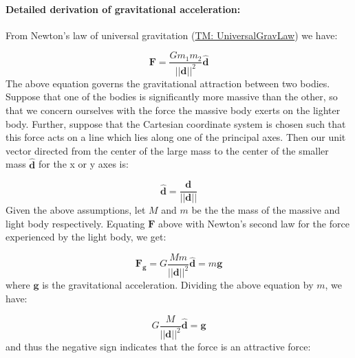 \documentclass[12pt]{article}
\begin{document}
\paragraph{Detailed derivation of gravitational acceleration:}
\label{GD:accelGravityDeriv}
From Newton's law of universal gravitation (\hyperref[TM:UniversalGravLaw]{TM: UniversalGravLaw}) we have:

\begin{displaymath}
\mathbf{F}=\frac{G {m_{1}} {m_{2}}}{{\text{||}\mathbf{d}\text{||}^{2}}} \mathbf{\hat{d}}
\end{displaymath}
The above equation governs the gravitational attraction between two bodies. Suppose that one of the bodies is significantly more massive than the other, so that we concern ourselves with the force the massive body exerts on the lighter body. Further, suppose that the Cartesian coordinate system is chosen such that this force acts on a line which lies along one of the principal axes. Then our unit vector directed from the center of the large mass to the center of the smaller mass $\mathbf{\hat{d}}$ for the x or y axes is:

\begin{displaymath}
\mathbf{\hat{d}}=\frac{\mathbf{d}}{\text{||}\mathbf{d}\text{||}}
\end{displaymath}
Given the above assumptions, let $M$ and $m$ be the the mass of the massive and light body respectively. Equating $\mathbf{F}$ above with Newton's second law for the force experienced by the light body, we get:

\begin{displaymath}
{\mathbf{F}_{\mathbf{g}}}=G \frac{M m}{{\text{||}\mathbf{d}\text{||}^{2}}} \mathbf{\hat{d}}=m \mathbf{g}
\end{displaymath}
where $\mathbf{g}$ is the gravitational acceleration. Dividing the above equation by $m$,  we have:

\begin{displaymath}
G \frac{M}{{\text{||}\mathbf{d}\text{||}^{2}}} \mathbf{\hat{d}}=\mathbf{g}
\end{displaymath}
and thus the negative sign indicates that the force is an attractive force:
\end{document}
